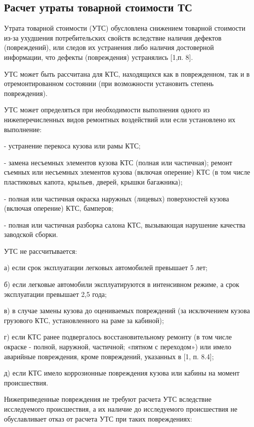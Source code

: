 \subsection{Расчет утраты товарной стоимости ТС}


\par Утрата товарной стоимости (УТС) обусловлена снижением товарной стоимости из-за ухудшения потребительских свойств вследствие наличия дефектов (повреждений), или следов их устранения либо наличия достоверной информации, что дефекты (повреждения) устранялись [1,п. 8].

	УТС может быть рассчитана для КТС, находящихся как в поврежденном, так и в отремонтированном состоянии (при возможности установить степень повреждения).

УТС может определяться при необходимости выполнения одного из нижеперечисленных видов ремонтных воздействий или если установлено их выполнение:

-	устранение перекоса кузова или рамы КТС;

-	замена несъемных элементов кузова КТС (полная или частичная); ремонт съемных или несъемных элементов кузова (включая оперение) КТС (в том числе пластиковых капота, крыльев, дверей, крышки багажника);

-	полная или частичная окраска наружных (лицевых) поверхностей кузова (включая оперение) КТС, бамперов;

-	полная или частичная разборка салона КТС, вызывающая нарушение качества заводской сборки.

УТС не рассчитывается:

а)	если срок эксплуатации легковых автомобилей превышает 5 лет;

б)	если легковые автомобили эксплуатируются в интенсивном режиме, а срок эксплуатации превышает 2,5 года;


в)	в случае замены кузова до оцениваемых повреждений (за исключением кузова грузового КТС, установленного на раме за кабиной);

г)	если КТС ранее подвергалось восстановительному ремонту (в том числе окраске - полной, наружной, частичной; «пятном с переходом») или имело аварийные повреждения, кроме повреждений, указанных в [1, п. 8.4];

д)	если КТС имело коррозионные повреждения кузова или кабины на момент происшествия.



Нижеприведенные повреждения не требуют расчета УТС вследствие исследуемого происшествия, а их наличие до исследуемого происшествия не обуславливает отказ от расчета УТС при таких повреждениях:

